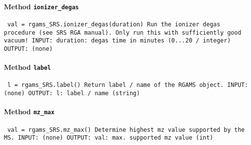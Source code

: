 \paragraph{Method \texttt{ionizer_degas}}
\vspace{1ex}
\texttt{\newline
val = rgams_SRS.ionizer_degas(duration)\newline
\newline
Run the ionizer degas procedure (see SRS RGA manual). Only run this with sufficiently good vacuum!\newline
\newline
INPUT:\newline
duration: degas time in minutes (0...20 / integer)\newline
\newline
OUTPUT:\newline
(none)\newline
\newline
}

\paragraph{Method \texttt{label}}
\vspace{1ex}
\texttt{\newline
l = rgams_SRS.label()\newline
\newline
Return label / name of the RGAMS object.\newline
\newline
INPUT:\newline
(none)\newline
\newline
OUTPUT:\newline
l: label / name (string)\newline
\newline
}

\paragraph{Method \texttt{mz_max}}
\vspace{1ex}
\texttt{\newline
val = rgams_SRS.mz_max()\newline
\newline
Determine highest mz value supported by the MS.\newline
\newline
INPUT:\newline
(none)\newline
\newline
OUTPUT:\newline
val: max. supported mz value (int)\newline
\newline
}

